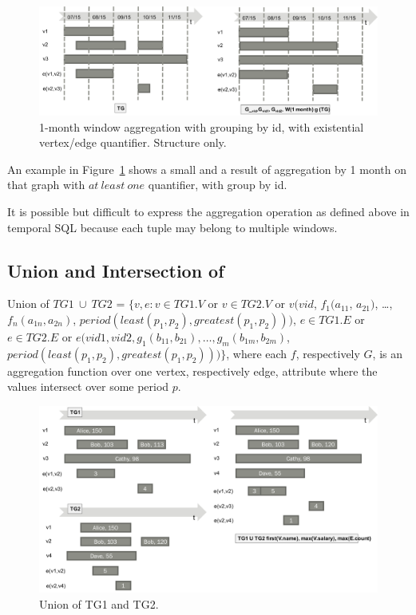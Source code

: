 \begin{figure}
\includegraphics[width=6.5in]{figs/agg1.pdf}
\caption{1-month window aggregation with grouping by id, with
  existential vertex/edge quantifier.  Structure only.}
\label{fig:agg1}
\end{figure}

An example in Figure~\ref{fig:agg1} shows a small \tg and a result of
aggregation by 1 month on that graph with $at\ least\ one$ quantifier,
with group by id.

It is possible but difficult to express the aggregation operation as
defined above in temporal SQL because each tuple may belong to
multiple windows.

\subsection{Union and Intersection of \tgs}

\begin{definition}[Union]
Union of $TG1\ \cup\ TG2$ = $\{v, e: v \in TG1.V$ or $v \in TG2.V$ or
$v(vid$, $f_1(a_{11}$, $a_{21})$, \ldots, $f_n(a_{1n}, a_{2n})$,
$period(least(p_1, p_2), greatest(p_1, p_2)))$, $e \in TG1.E$ or $e
\in TG2.E$ or $e(vid1, vid2, g_1(b_{11}, b_{21}), \ldots, g_m(b_{1m},
b_{2m})$, $period(least(p_1, p_2), greatest(p_1, p_2))) \}$, where
each $f$, respectively $G$, is an aggregation function over one
vertex, respectively edge, attribute where the values intersect over
some period $p$.
\label{def:union}
\end{definition}

\begin{figure}
\includegraphics[width=6.5in]{figs/union.pdf}
\caption{Union of TG1 and TG2.}
\label{fig:union}
\end{figure}

